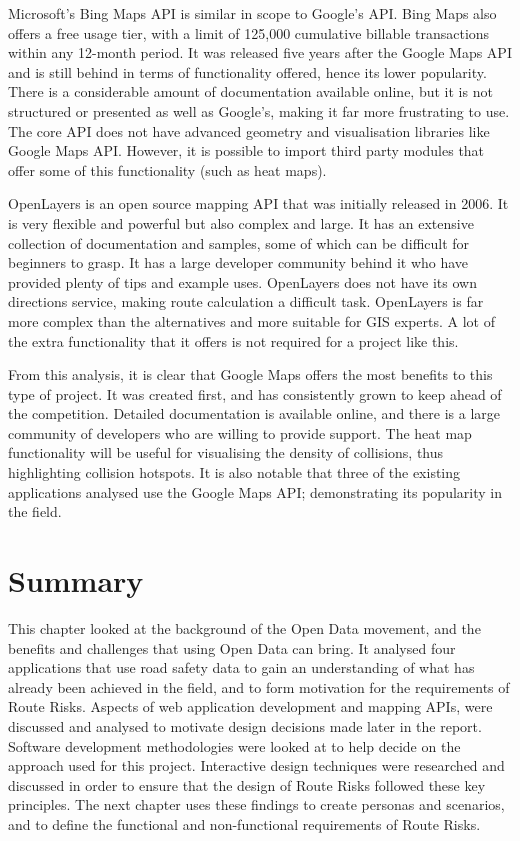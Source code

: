 \documentclass[authoryearcitations]{UoYCSproject}
\begin{document}
Microsoft's Bing Maps API \citep{Microsoft} is similar in scope to Google's API. Bing Maps also offers a free usage tier, with a limit of 125,000 cumulative billable transactions within any 12-month period. It was released five years after the Google Maps API and is still behind in terms of functionality offered, hence its lower popularity. There is a considerable amount of documentation available online, but it is not structured or presented as well as Google's, making it far more frustrating to use. The core API does not have advanced geometry and visualisation libraries like Google Maps API. However, it is possible to import third party modules that offer some of this functionality (such as heat maps). 

OpenLayers \citep{OpenLayers} is an open source mapping API that was initially released in 2006. It is very flexible and powerful but also complex and large. It has an extensive collection of documentation and samples, some of which can be difficult for beginners to grasp. It has a large developer community behind it who have provided plenty of tips and example uses. OpenLayers does not have its own directions service, making route calculation a difficult task. OpenLayers is far more complex than the alternatives and more suitable for GIS experts. A lot of the extra functionality that it offers is not required for a project like this.

From this analysis, it is clear that Google Maps offers the most benefits to this type of project. It was created first, and has consistently grown to keep ahead of the competition. Detailed documentation is available online, and there is a large community of developers who are willing to provide support. The heat map functionality will be useful for visualising the density of collisions, thus highlighting collision hotspots. It is also notable that three of the existing applications analysed use the Google Maps API; demonstrating its popularity in the field.

\section{Summary}
This chapter looked at the background of the Open Data movement, and the benefits and challenges that using Open Data can bring. It analysed four applications that use road safety data to gain an understanding of what has already been achieved in the field, and to form motivation for the requirements of Route Risks. Aspects of web application development and mapping APIs, were discussed and analysed to motivate design decisions made later in the report. Software development methodologies were looked at to help decide on the approach used for this project. Interactive design techniques were researched and discussed in order to ensure that the design of  Route Risks followed these key principles. The next chapter uses these findings to create personas and scenarios, and to define the functional and non-functional requirements of Route Risks.
\end{document}
